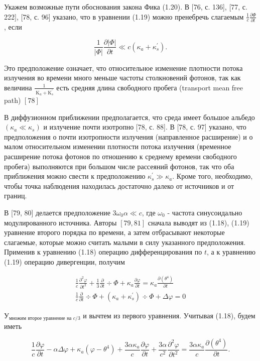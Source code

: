 \documentclass[10pt]{article}
\begin{document}
Укажем возможные пути обоснования закона Фика (1.20). В [76, с. 136], [77, с. 222$]$, [78, с. 96] указано, что в уравнении (1.19) можно пренебречь слагаемым $\frac{1}{c} \frac{\partial \Phi}{\partial t}$, если

$$
\frac{1}{|\Phi|} \frac{\partial|\Phi|}{\partial t} \ll c\left(\kappa_{a}+\kappa_{s}^{\prime}\right) .
$$

Это предположение означает, что относительное изменение плотности потока излучения во времени много меньше частоты столкновений фотонов, так как величина $\frac{1}{\mathrm{~K}_{a}+\mathrm{K}_{s}^{\prime}}$ есть средняя длина свободного пробега (transport mean free path) $[78]$

В диффузионном приближении предполагается, что среда имеет большое альбедо $\left(\kappa_{a} \ll \kappa_{s}\right)$ и излучение почти изотропно [78, с. 88]. В [78, с. 97] указано, что предположения о почти изотропности излучения (направленное расширение) и о малом относительном изменении плотности потока излучения (временное расширение потока фотонов по отношению к среднему времени свободного пробега) выполняются при большом числе рассеяний фотонов, так что оба приближения можно свести к предположению $\kappa_{s}^{\prime} \gg \kappa_{a}$. Кроме того, необходимо, чтобы точка наблюдения находилась достаточно далеко от источников и от границ.

В [79, 80] делается предположение $3 \omega_{0} \alpha \ll c$, где $\omega_{0}$ - частота синусоидально модулированного источника. Авторы $[79,81]$ сначала выводят из (1.18), (1.19) уравнение второго порядка по времени, а затем отбрасывают некоторые слагаемые, которые можно считать малыми в силу указанного предположения. Применив к уравнению (1.18) операцию дифференцирования по $t$, а к уравнению (1.19) операцию дивергенции, получим

$$
\begin{gathered}
\frac{1}{c} \frac{\partial^{2} \varphi}{\partial t^{2}}+\frac{1}{3} \frac{\partial}{\partial t} \div \Phi+\kappa_{a} \frac{\partial \varphi}{\partial t}=\kappa_{a} \frac{\partial\left(\theta^{4}\right)}{\partial t} \\
\frac{1}{c} \frac{\partial}{\partial t} \div \Phi+\left(\kappa_{a}+\kappa_{s}^{\prime}\right) \div \Phi+\Delta \varphi=0
\end{gathered}
$$

$У_{\text {множим второе уравнение на } c / 3}$ и вычтем из первого уравнения. Учитывая (1.18), будем иметь

$$
\frac{1}{c} \frac{\partial \varphi}{\partial t}-\alpha \Delta \varphi+\kappa_{a}\left(\varphi-\theta^{4}\right)+\frac{3 \alpha \kappa_{a}}{c} \frac{\partial \varphi}{\partial t}+\frac{3 \alpha}{c^{2}} \frac{\partial^{2} \varphi}{\partial t^{2}}=\frac{3 \alpha \kappa_{a}}{c} \frac{\partial\left(\theta^{4}\right)}{\partial t} .
$$
\end{document}
